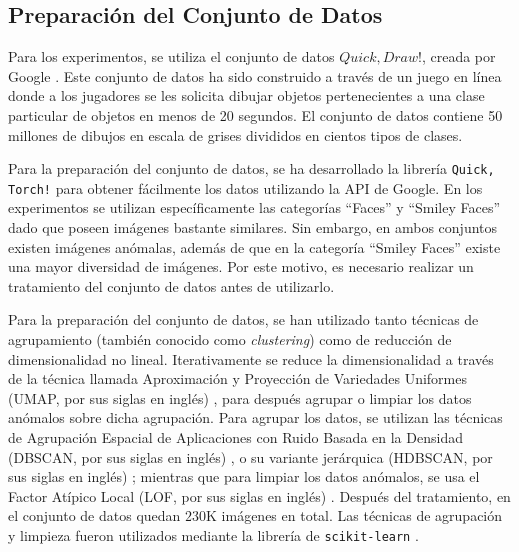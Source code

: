 
\subsection{Preparación del Conjunto de Datos}\label{ssec:preparacion-dataset}  %

Para los experimentos, se utiliza el conjunto de datos $Quick, Draw!$, creada por Google \cite{jongejan2016quick}. Este conjunto de datos ha sido construido a través de un juego en línea donde a los jugadores se les solicita dibujar objetos pertenecientes a una clase particular de objetos en menos de 20 segundos. El conjunto de datos contiene 50 millones de dibujos en escala de grises divididos en cientos tipos de clases.

Para la preparación del conjunto de datos, se ha desarrollado la librería \texttt{Quick, Torch!} \cite{munoz2023quicktorch} para obtener fácilmente los datos utilizando la API de Google.
En los experimentos se utilizan específicamente las categorías ``Faces'' y ``Smiley Faces''
dado que poseen imágenes bastante similares. Sin embargo, en ambos conjuntos existen imágenes anómalas, además de que en la categoría ``Smiley Faces'' existe una mayor diversidad de imágenes. Por este motivo, es necesario realizar un tratamiento del conjunto de datos antes de utilizarlo.

Para la preparación del conjunto de datos, se han utilizado tanto técnicas de agrupamiento (también conocido como \textit{clustering}) como de reducción de dimensionalidad no lineal.
Iterativamente se reduce la dimensionalidad a través de la técnica llamada Aproximación y Proyección de Variedades Uniformes (UMAP, por sus siglas en inglés) \cite{mcinnes2018umap}, para después agrupar o limpiar los datos anómalos sobre dicha agrupación. Para agrupar los datos, se utilizan las técnicas de Agrupación Espacial de Aplicaciones con Ruido Basada en la Densidad (DBSCAN, por sus siglas en inglés) \cite{ester1996density}, o su variante jerárquica (HDBSCAN, por sus siglas en inglés) \cite{campello2013density};
mientras que para limpiar los datos anómalos, se usa el Factor Atípico Local (LOF, por sus siglas en inglés) \cite{breunig2000lof}. Después del tratamiento, en el conjunto de datos quedan $230$K imágenes en total. Las técnicas de agrupación y limpieza fueron utilizados mediante la librería de \texttt{scikit-learn} \cite{sklearn}.

